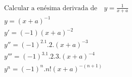 \begin{ex}
\begin{align}
&\text{Calcular a enésima derivada de}\quad y=\frac{1}{x+a}\nonumber\\
&y=(x+a)^{-1}\nonumber\\
&y'=(-1)(x+a)^{-2}\nonumber\\
&y''=(-1)^2.1.2.(x+a)^{-3}\nonumber\\
&y'''=(-1)^3.1.2.3.(x+a)^{-4}\nonumber\\
&y^{n}=(-1)^{n}.n!(x+a)^{-(n+1)}\nonumber
\end{align}
\end{ex}
